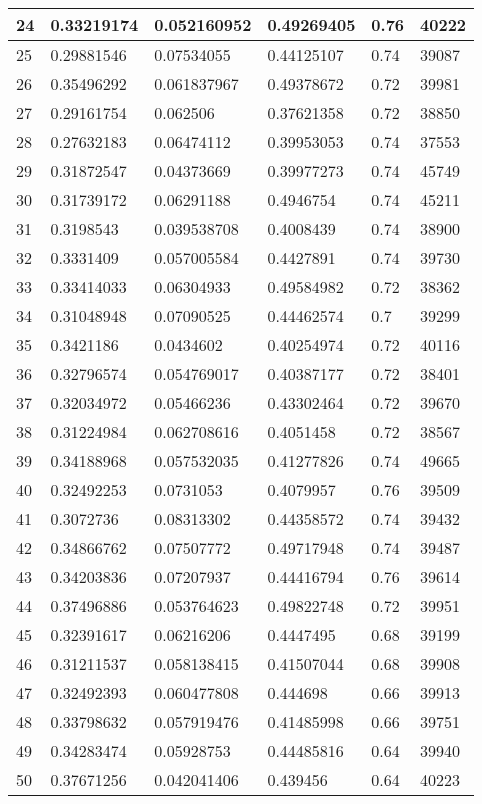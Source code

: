 \begin{longtable}{|l|l|l|l|l|l|}
24 & 0.33219174 & 0.052160952 & 0.49269405 & 0.76 & 40222 \\ \hline 
25 & 0.29881546 & 0.07534055 & 0.44125107 & 0.74 & 39087 \\ \hline 
26 & 0.35496292 & 0.061837967 & 0.49378672 & 0.72 & 39981 \\ \hline 
27 & 0.29161754 & 0.062506 & 0.37621358 & 0.72 & 38850 \\ \hline 
28 & 0.27632183 & 0.06474112 & 0.39953053 & 0.74 & 37553 \\ \hline 
29 & 0.31872547 & 0.04373669 & 0.39977273 & 0.74 & 45749 \\ \hline 
30 & 0.31739172 & 0.06291188 & 0.4946754 & 0.74 & 45211 \\ \hline 
31 & 0.3198543 & 0.039538708 & 0.4008439 & 0.74 & 38900 \\ \hline 
32 & 0.3331409 & 0.057005584 & 0.4427891 & 0.74 & 39730 \\ \hline 
33 & 0.33414033 & 0.06304933 & 0.49584982 & 0.72 & 38362 \\ \hline 
34 & 0.31048948 & 0.07090525 & 0.44462574 & 0.7 & 39299 \\ \hline 
35 & 0.3421186 & 0.0434602 & 0.40254974 & 0.72 & 40116 \\ \hline 
36 & 0.32796574 & 0.054769017 & 0.40387177 & 0.72 & 38401 \\ \hline 
37 & 0.32034972 & 0.05466236 & 0.43302464 & 0.72 & 39670 \\ \hline 
38 & 0.31224984 & 0.062708616 & 0.4051458 & 0.72 & 38567 \\ \hline 
39 & 0.34188968 & 0.057532035 & 0.41277826 & 0.74 & 49665 \\ \hline 
40 & 0.32492253 & 0.0731053 & 0.4079957 & 0.76 & 39509 \\ \hline 
41 & 0.3072736 & 0.08313302 & 0.44358572 & 0.74 & 39432 \\ \hline 
42 & 0.34866762 & 0.07507772 & 0.49717948 & 0.74 & 39487 \\ \hline 
43 & 0.34203836 & 0.07207937 & 0.44416794 & 0.76 & 39614 \\ \hline 
44 & 0.37496886 & 0.053764623 & 0.49822748 & 0.72 & 39951 \\ \hline 
45 & 0.32391617 & 0.06216206 & 0.4447495 & 0.68 & 39199 \\ \hline 
46 & 0.31211537 & 0.058138415 & 0.41507044 & 0.68 & 39908 \\ \hline 
47 & 0.32492393 & 0.060477808 & 0.444698 & 0.66 & 39913 \\ \hline 
48 & 0.33798632 & 0.057919476 & 0.41485998 & 0.66 & 39751 \\ \hline 
49 & 0.34283474 & 0.05928753 & 0.44485816 & 0.64 & 39940 \\ \hline 
50 & 0.37671256 & 0.042041406 & 0.439456 & 0.64 & 40223 \\ \hline 
\end{longtable}